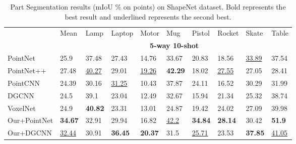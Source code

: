 \documentclass{article}
\begin{document}
\begin{table}[h]
  \caption{Part Segmentation results (mIoU \% on points) on ShapeNet dataset. Bold represents the best result and underlined represents the second best.}
  \label{part4}
  \centering
  \normalsize
  \setlength{\tabcolsep}{4.5pt}
  \begin{tabular}{llllllllll}
    \toprule
    &Mean&Lamp&Laptop&Motor&Mug&Pistol&Rocket&Skate&Table\\
    \cmidrule(r){2-10}
    & \multicolumn{9}{c}{\textbf{5-way 10-shot}}\\
    \cmidrule(r){2-10}
    PointNet &25.9 &37.48 &27.43 &14.76 &33.67 &20.83 &18.56 &\underline{33.89} &37.54\\
    PointNet++ &27.48 &\underline{40.27} &29.01 &\underline{19.26} &\textbf{42.29} &18.02 &\underline{27.55} &27.05 &28.41\\
    PointCNN &24.39 &30.16 &\underline{31.25} &10.43 &37.87 &24.11 &16.52 &30.29 &31.99\\
    DGCNN &24.5 &39.1 &23.04 &12.49 &32.67 &15.94 &21.34 &25.32 &38.74\\ 
    
    VoxelNet &24.9 &\textbf{40.82} &23.31 &13.01 &24.87 &19.42 &24.02 &27.09 &39.98\\
    \midrule
    Our+PointNet &\textbf{34.67} &32.91 &29.94 &16.82 &\underline{42.2} &\textbf{34.84} &\textbf{28.14} &30.42 &\textbf{51.9} \\
    Our+DGCNN  &\underline{32.44} &30.91 &\textbf{36.45} &\textbf{20.37} &31.5 &\underline{25.71} &23.53 &\textbf{37.85} &\underline{41.05}\\ 
    
    \bottomrule
  \end{tabular}
\end{table}
\end{document}
